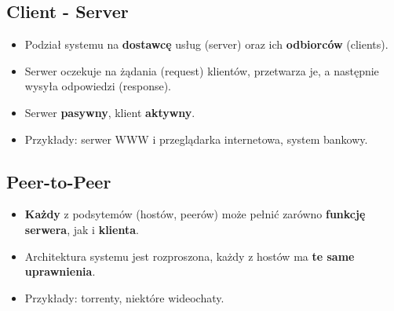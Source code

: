 \documentclass[main.tex]{subfiles}
\begin{document}
    \subsection{Client - Server}
    \begin{itemize}[noitemsep]
        \item Podział systemu na \textbf{dostawcę} usług (server) oraz ich \textbf{odbiorców} (clients).
        \item Serwer oczekuje na żądania (request) klientów, przetwarza je, a następnie wysyła odpowiedzi (response).
        \item Serwer \textbf{pasywny}, klient \textbf{aktywny}.
        \item Przykłady: serwer WWW i przeglądarka internetowa, system bankowy.
    \end{itemize}

    \subsection{Peer-to-Peer}

    \begin{itemize}[noitemsep]
        \item \textbf{Każdy} z podsytemów (hostów, peerów) może pełnić zarówno \textbf{funkcję serwera}, jak i
        \textbf{klienta}.
        \item Architektura systemu jest rozproszona, każdy z hostów ma \textbf{te same uprawnienia}.
        \item Przykłady: torrenty, niektóre wideochaty.
    \end{itemize}
\end{document}
